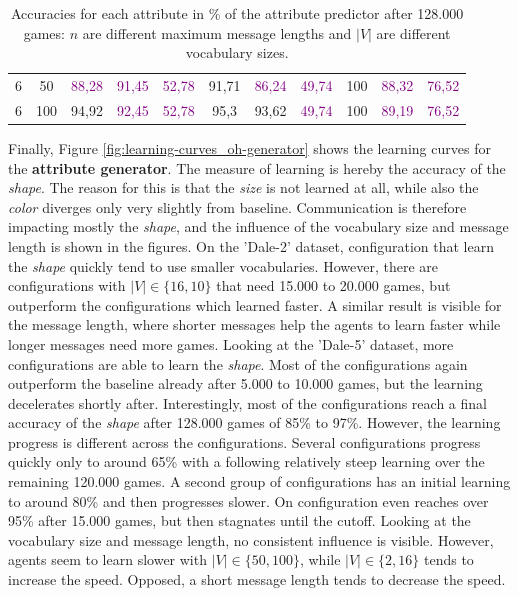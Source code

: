 \begin{table}[ht]
\begin{tabular}{cc|ccc|ccc|ccc}
        {6}                           & {50}    & \textcolor{purple}{88,28}           & \textcolor{purple}{91,45}           & \textcolor{purple}{52,78}                & {91,71}                         & \textcolor{purple}{86,24}       & \textcolor{purple}{49,74}      & {100}                           & \textcolor{purple}{88,32}       & \textcolor{purple}{76,52}      \\
        {6}                           & {100}   & {94,92}                             & \textcolor{purple}{92,45}           & \textcolor{purple}{52,78}                & {95,3}                          & {93,62}                         & \textcolor{purple}{49,74}      & {100}                           & \textcolor{purple}{89,19}       & \textcolor{purple}{76,52}      \\
        \bottomrule
    \end{tabular}
    \caption{Accuracies for each attribute in \% of the attribute predictor after 128.000 games: $n$ are different maximum message lengths and $|V|$ are different vocabulary sizes.}
    \label{tab:results:attribute-predictor-game}
\end{table}

Finally, Figure \ref{fig:learning-curves_oh-generator} shows the learning curves for the \textbf{attribute generator}.
The measure of learning is hereby the accuracy of the \emph{shape}.
The reason for this is that the \emph{size} is not learned at all, while also the \emph{color} diverges only very slightly from baseline.
Communication is therefore impacting mostly the \emph{shape}, and the influence of the vocabulary size and message length is shown in the figures.
On the 'Dale-2' dataset, configuration that learn the \emph{shape} quickly tend to use smaller vocabularies.
However, there are configurations with $|V| \in \{16,10\}$ that need 15.000 to 20.000 games, but outperform the configurations which learned faster.
A similar result is visible for the message length, where shorter messages help the agents to learn faster while longer messages need more games.
Looking at the 'Dale-5' dataset, more configurations are able to learn the \emph{shape}.
Most of the configurations again outperform the baseline already after 5.000 to 10.000 games, but the learning decelerates shortly after.
Interestingly, most of the configurations reach a final accuracy of the \emph{shape} after 128.000 games of 85\% to 97\%.
However, the learning progress is different across the configurations.
Several configurations progress quickly only to around 65\% with a following relatively steep learning over the remaining 120.000 games.
A second group of configurations has an initial learning to around 80\% and then progresses slower.
On configuration even reaches over 95\% after 15.000 games, but then stagnates until the cutoff.
Looking at the vocabulary size and message length, no consistent influence is visible.
However, agents seem to learn slower with $|V| \in \{50,100\}$, while $|V| \in \{2,16\}$ tends to increase the speed.
Opposed, a short message length tends to decrease the speed.

